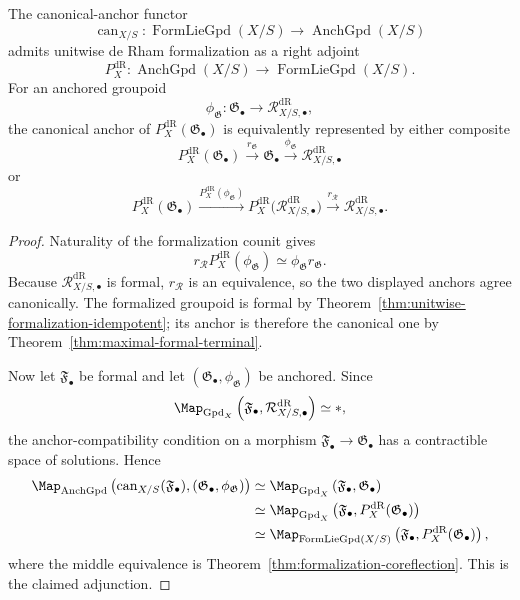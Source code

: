 \begin{proposition}
\label{prop:anchored-formal-coreflection}
The canonical-anchor functor
\[
    \operatorname{can}_{X/S}:
    \operatorname{FormLieGpd}(X/S)
    \longrightarrow
    \operatorname{AnchGpd}(X/S)
\]
admits unitwise de Rham formalization as a right adjoint
\[
    P_X^{\mathrm{dR}}:
    \operatorname{AnchGpd}(X/S)
    \longrightarrow
    \operatorname{FormLieGpd}(X/S).
\]
For an anchored groupoid
\[
    \phi_{\mathfrak G}:
    \mathfrak G_\bullet\to \mathcal R^{\mathrm{dR}}_{X/S,\bullet},
\]
the canonical anchor of
$P_X^{\mathrm{dR}}(\mathfrak G_\bullet)$ is equivalently represented by
either composite
\[
    P_X^{\mathrm{dR}}(\mathfrak G_\bullet)
    \xrightarrow{r_{\mathfrak G}}
    \mathfrak G_\bullet
    \xrightarrow{\phi_{\mathfrak G}}
    \mathcal R^{\mathrm{dR}}_{X/S,\bullet}
\]
or
\[
    P_X^{\mathrm{dR}}(\mathfrak G_\bullet)
    \xrightarrow{P_X^{\mathrm{dR}}(\phi_{\mathfrak G})}
    P_X^{\mathrm{dR}}\bigl(\mathcal R^{\mathrm{dR}}_{X/S,\bullet}\bigr)
    \xrightarrow{r_{\mathcal R}}
    \mathcal R^{\mathrm{dR}}_{X/S,\bullet}.
\]
\end{proposition}

\begin{proof}
Naturality of the formalization counit gives
\[
    r_{\mathcal R}
    P_X^{\mathrm{dR}}(\phi_{\mathfrak G})
    \simeq
    \phi_{\mathfrak G}r_{\mathfrak G}.
\]
Because $\mathcal R^{\mathrm{dR}}_{X/S,\bullet}$ is formal, $r_{\mathcal R}$ is an equivalence, so the two
displayed anchors agree canonically.  The formalized groupoid is formal by
Theorem~\ref{thm:unitwise-formalization-idempotent}; its anchor is therefore the
canonical one by Theorem~\ref{thm:maximal-formal-terminal}.

Now let $\mathfrak F_\bullet$ be formal and let
$(\mathfrak G_\bullet,\phi_{\mathfrak G})$ be anchored.  Since
\[
    \Map_{\operatorname{Gpd}_X}
    \left(
        \mathfrak F_\bullet,
        \mathcal R^{\mathrm{dR}}_{X/S,\bullet}
    \right)
    \simeq *,
\]
the anchor-compatibility condition on a morphism
$\mathfrak F_\bullet\to\mathfrak G_\bullet$ has a contractible space of
solutions.  Hence
\[
\begin{aligned}
    \Map_{\operatorname{AnchGpd}}
    \left(
        \operatorname{can}_{X/S}(\mathfrak F_\bullet),
        (\mathfrak G_\bullet,\phi_{\mathfrak G})
    \right)
    &\simeq
    \Map_{\operatorname{Gpd}_X}
    \left(
        \mathfrak F_\bullet,
        \mathfrak G_\bullet
    \right)\\
    &\simeq
    \Map_{\operatorname{Gpd}_X}
    \left(
        \mathfrak F_\bullet,
        P_X^{\mathrm{dR}}(\mathfrak G_\bullet)
    \right)\\
    &\simeq
    \Map_{\operatorname{FormLieGpd}(X/S)}
    \left(
        \mathfrak F_\bullet,
        P_X^{\mathrm{dR}}(\mathfrak G_\bullet)
    \right),
\end{aligned}
\]
where the middle equivalence is
Theorem~\ref{thm:formalization-coreflection}.  This is the claimed adjunction.
\end{proof}


